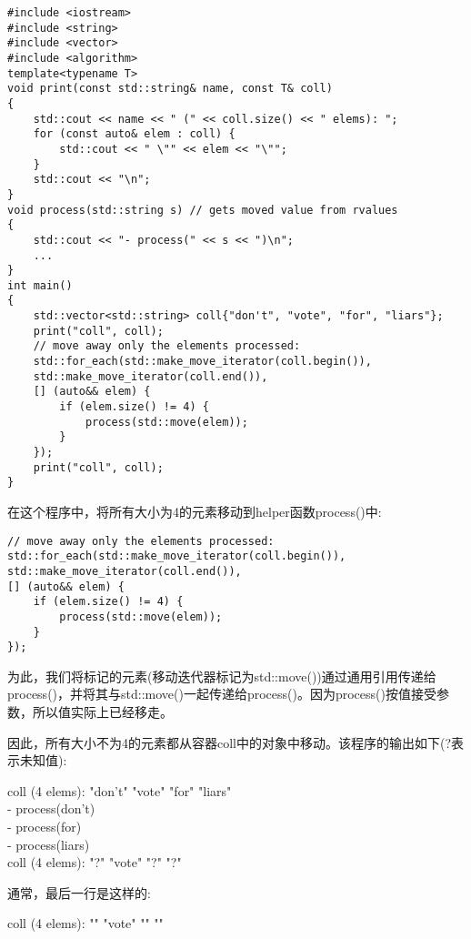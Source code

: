\begin{lstlisting}[caption={}]
#include <iostream>
#include <string>
#include <vector>
#include <algorithm>
template<typename T>
void print(const std::string& name, const T& coll)
{
	std::cout << name << " (" << coll.size() << " elems): ";
	for (const auto& elem : coll) {
		std::cout << " \"" << elem << "\"";
	}
	std::cout << "\n";
}
void process(std::string s) // gets moved value from rvalues
{
	std::cout << "- process(" << s << ")\n";
	...
}
int main()
{
	std::vector<std::string> coll{"don't", "vote", "for", "liars"};
	print("coll", coll);
	// move away only the elements processed:
	std::for_each(std::make_move_iterator(coll.begin()),
	std::make_move_iterator(coll.end()),
	[] (auto&& elem) {
		if (elem.size() != 4) {
			process(std::move(elem));
		}
	});
	print("coll", coll);
}
\end{lstlisting}

在这个程序中，将所有大小为4的元素移动到helper函数process()中:\par

\begin{lstlisting}[caption={}]
// move away only the elements processed:
std::for_each(std::make_move_iterator(coll.begin()),
std::make_move_iterator(coll.end()),
[] (auto&& elem) {
	if (elem.size() != 4) {
		process(std::move(elem));
	}
});
\end{lstlisting}

为此，我们将标记的元素(移动迭代器标记为std::move())通过通用引用传递给process()，并将其与std::move()一起传递给process()。因为process()按值接受参数，所以值实际上已经移走。\par

因此，所有大小不为4的元素都从容器coll中的对象中移动。该程序的输出如下(?表示未知值):\par

\begin{tcolorbox}[colback=white,colframe=black]
coll (4 elems): "don't" "vote" "for" "liars" \\
- process(don't) \\
- process(for) \\
- process(liars) \\
coll (4 elems): "?" "vote" "?" "?"
\end{tcolorbox}

通常，最后一行是这样的:\par

\begin{tcolorbox}[colback=white,colframe=black]
coll (4 elems): "" "vote" "" ""
\end{tcolorbox}

